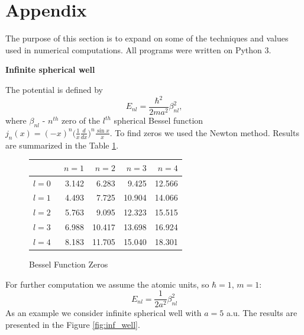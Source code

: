 \documentclass[a4paper, 14pt]{article}
\begin{document}
\section{Appendix}\label{appendix}
The purpose of this section is to expand on some of the techniques and values used in numerical computations. All programs were written on Python 3.
\begin{center}
		\large
		\textbf{ Infinite spherical well}		\\[0.5 cm]
\end{center}
The potential is defined by 
$$E_{nl} = \frac{\hbar^2}{2ma^2}\beta_{nl}^2,$$
where $\beta_{nl}$ -  $n^{th}$ zero of the $l^{th}$ spherical Bessel function $j_n(x) = (-x)^n\bigg(\displaystyle{\frac{1}{x} \frac{d}{dx}}\bigg)^n \frac{\sin{x}}{x}.$
To find zeros we used the Newton method. Results are summarized in the Table \ref{bess_0}.

\begin{figure}[h!]
\centering
\begin{tabular}{lrrrr}
\toprule
{} &  \ $n=1$ &   $n=2$ &   $n=3$ &   $n=4$ \\
\midrule
$l=0$ &  3.142 &   6.283 &   9.425 &  12.566 \\
$l=1$ &  4.493 &   7.725 &  10.904 &  14.066 \\
$l=2$ &  5.763 &   9.095 &  12.323 &  15.515 \\
$l=3$ &  6.988 &  10.417 &  13.698 &  16.924 \\
$l=4$ &  8.183 &  11.705 &  15.040 &  18.301 \\
\bottomrule
\end{tabular}
\caption{Bessel Function Zeros}
\label{bess_0}
\end{figure}
For further computation we assume the atomic units, so $\hbar =  1$, $m=  1$:
$$E_{nl} = \frac{1}{2a^2}\beta_{nl}^2$$
As an example we consider infinite spherical well with $a= 5$ a.u.
The results are presented in the Figure \ref{fig:inf_well}.
\end{document}
